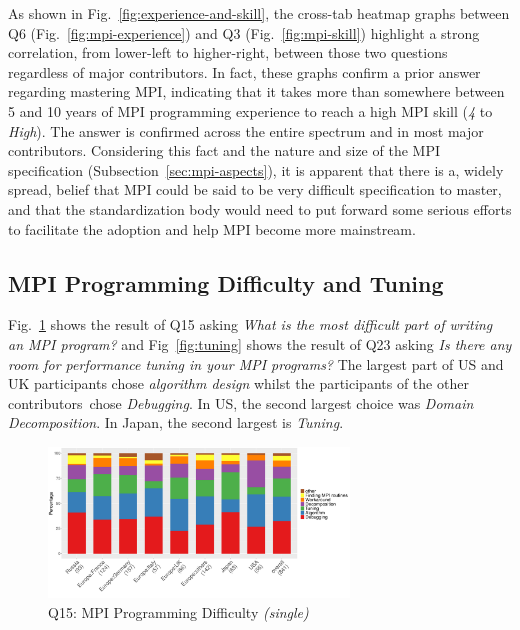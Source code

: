 \documentclass[preprint,5p,times]{elsarticle}
\def\myquote#1{{\it #1}}
\newcommand{\revision}[2]{{\color{blue}#2}}
\def\countries{contributors\xspace{}}%
\def\mcountries{major contributors\xspace{}}%
\begin{document}
As shown in Fig.~\ref{fig:experience-and-skill}, the cross-tab heatmap graphs
between Q6 (Fig.~\ref{fig:mpi-experience}) and Q3 \revision{(Fig.~\ref{fig:mpi-skill}),}{(Fig.~\ref{fig:mpi-skill})}
highlight a strong correlation, from lower-left to higher-right, between those
two questions regardless of \mcountries. In fact, these graphs confirm a prior
answer regarding mastering MPI, indicating that it takes more than somewhere
between 5 and 10 years of MPI programming experience to reach a high MPI skill
(\myquote{4} to \myquote{High}). The answer is confirmed across the entire
spectrum and in most \mcountries.
Considering this fact and the nature and size of the MPI specification
(Subsection~\ref{sec:mpi-aspects}), it is apparent that there is a, widely
spread, belief that MPI could be said to be very difficult specification to
master, and that the standardization body would need to put forward some serious
efforts to facilitate the adoption and help MPI become more mainstream.

\subsection{MPI Programming Difficulty and Tuning}

Fig.~\ref{fig:difficulty} shows the result of Q15 asking \myquote{What is the
most difficult part of writing an MPI program?} and
Fig~\ref{fig:tuning} shows the result of Q23 asking \myquote{Is there any
room for performance tuning in your MPI programs?} The largest part
of US and UK participants chose \myquote{algorithm design} whilst the
participants of the other \countries\  chose
\myquote{Debugging}. In US, the second largest choice was
\myquote{Domain Decomposition}. In Japan, the second largest is
\myquote{Tuning}.

\begin{figure}[tb]
\begin{center}
\includegraphics[width=8.0cm]{R-scripts/Q15.pdf}
\vspace{-2mm}
\caption{Q15: MPI Programming Difficulty {\it(single)}}
\label{fig:difficulty}
\end{center}
\end{figure}
\end{document}
